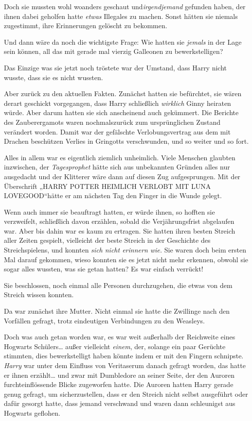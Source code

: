 {Doch sie mussten wohl woanders geschaut und\emph{irgendjemand} gefunden haben, der ihnen dabei geholfen hatte \emph{etwas} Illegales zu machen. Sonst hätten sie niemals zugestimmt, ihre Erinnerungen gelöscht zu bekommen.

Und dann wäre da noch die wichtigste Frage: Wie hatten sie \emph{jemals} in der Lage sein können, all das mit gerade mal vierzig Galleonen zu bewerkstelligen?

Das Einzige was sie jetzt noch tröstete war der Umstand, dass Harry nicht wusste, dass sie es nicht wussten.

Aber zurück zu den aktuellen Fakten. Zunächst hatten sie befürchtet, sie wären derart geschickt vorgegangen, dass Harry schließlich \emph{wirklich} Ginny heiraten würde. Aber darum hatten sie sich anscheinend auch gekümmert. Die Berichte des Zauberergamots waren nochmalszurück zum ursprünglichen Zustand verändert worden. Damit war der gefälschte Verlobungsvertrag aus dem mit Drachen beschützen Verlies in Gringotts verschwunden, und so weiter und so fort.

Alles in allem war es eigentlich ziemlich unheimlich. Viele Menschen glaubten inzwischen, der \emph{Tagesprophet} hätte sich aus unbekannten Gründen alles nur ausgedacht und der Klitterer wäre dann auf diesen Zug aufgesprungen. Mit der Überschrift „HARRY POTTER HEIMLICH VERLOBT MIT LUNA LOVEGOOD“hätte er am nächsten Tag den Finger in die Wunde gelegt.

Wenn auch immer sie beauftragt hatten, er würde ihnen, so hofften sie verzweifelt, schließlich davon erzählen, sobald die Verjährungsfrist abgelaufen war. Aber bis dahin war es kaum zu ertragen. Sie hatten ihren besten Streich aller Zeiten gespielt, vielleicht der beste Streich in der Geschichte des Streichspielens, und konnten \emph{sich nicht erinnern wie.} Sie waren doch beim ersten Mal darauf gekommen, wieso konnten sie es jetzt nicht mehr erkennen, obwohl sie sogar alles wussten, was sie getan hatten? Es war einfach verrückt!

Sie beschlossen, noch einmal alle Personen durchzugehen, die etwas von dem Streich wissen konnten.

Da war zunächst ihre Mutter. Nicht einmal sie hatte die Zwillinge nach den Vorfällen gefragt, trotz eindeutigen Verbindungen zu den Weasleys.

Doch was auch getan worden war, es war weit außerhalb der Reichweite eines Hogwarts Schülers… außer vielleicht \emph{einem}, der, solange ein paar Gerüchte stimmten, dies bewerkstelligt haben könnte indem er mit den Fingern schnipste. \emph{Harry} war unter dem Einfluss von Veritaserum danach gefragt worden, das hatte er ihnen erzählt… und zwar mit Dumbledore an seiner Seite, der den Auroren furchteinflössende Blicke zugeworfen hatte. Die Auroren hatten Harry gerade genug gefragt, um sicherzustellen, dass er den Streich nicht selbst ausgeführt oder dafür gesorgt hatte, dass jemand verschwand und waren dann schleunigst aus Hogwarts geflohen.

}
